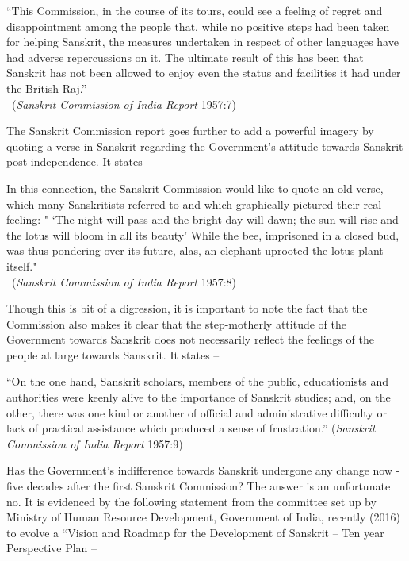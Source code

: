 \begin{myquote}
\eleven
“This Commission, in the course of its tours, could see a feeling of regret and disappointment among the people that, while no positive steps had been taken for helping Sanskrit, the measures undertaken in respect of other languages have had adverse repercussions on it. The ultimate result of this has been that Sanskrit has not been allowed to enjoy even the status and facilities it had under the British Raj.”\\[-15pt] 

~\hfill({\sl Sanskrit Commission of India Report} 1957:7)
\end{myquote}

The Sanskrit Commission report goes further to add a powerful imagery by quoting a verse in Sanskrit regarding the Government’s attitude towards Sanskrit post-independence. It states -
\begin{myquote}
\eleven
In this connection, the Sanskrit Commission would like to quote an old verse, which many Sanskritists referred to and which graphically pictured their real feeling: " `The night will pass and the bright day will dawn; the sun will rise and the lotus will bloom in all its beauty' While the bee, imprisoned in a closed bud, was thus pondering over its future, alas, an elephant uprooted the lotus-plant itself."\\[-15pt]   

~\hfill({\sl Sanskrit Commission of India Report} 1957:8)
\end{myquote}

Though this is bit of a digression, it is important to note the fact that the Commission also makes it clear that the step-motherly attitude of the Government towards Sanskrit does not necessarily reflect the feelings of the people at large towards Sanskrit.  It states – 

\begin{myquote}
\eleven
“On the one hand, Sanskrit scholars, members of the public, educationists and authorities were keenly alive to the importance of Sanskrit studies; and, on the other, there was one kind or another of official and administrative difficulty or lack of practical assistance which produced a sense of frustration.” \hfill({\sl Sanskrit Commission of India Report} 1957:9)
\end{myquote}

Has the Government’s indifference towards Sanskrit undergone any change now - five decades after the first Sanskrit Commission? The answer is an unfortunate no. It is evidenced by the following statement from the committee set up by Ministry of Human Resource Development, Government of India, recently (2016) to evolve a “Vision and Roadmap for the Development of Sanskrit – Ten year Perspective Plan – 


